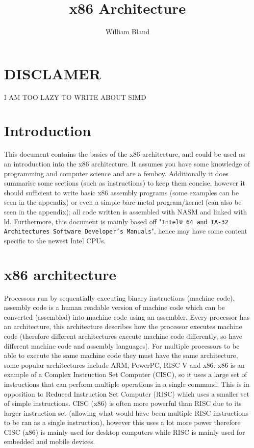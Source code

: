 \documentclass{article}
\title{\textbf{x86 Architecture}}
\author{William Bland}
\newcommand{\layout}[1]{\parbox{\linewidth}{#1}}
\begin{document}
\maketitle
\tableofcontents
\newpage

\nocite{*}

\layout{
  \section{DISCLAMER}

  { \fontsize{30pt}{35pt}\selectfont I AM TOO LAZY TO WRITE ABOUT SIMD }

  \section{Introduction}

  This document contains the basics of the x86 architecture, and could be used as an introduction into the x86 architecture.
  It assumes you have some knowledge of programming and computer science and are a femboy.
  Additionally it does summarise some sections (such as instructions) to keep them concise, however it should sufficient to write basic x86 assembly programs (some examples can be seen in the appendix) or even a simple bare-metal program/kernel (can also be seen in the appendix);
  all code written is assembled with NASM and linked with ld.
  Furthermore, this document is mainly based off "\texttt{Intel® 64 and IA-32 Architectures Software Developer’s Manuals}", hence may have some content specific to the newest Intel CPUs.
}

\layout{
  \section{x86 architecture}

  Processors run by sequentially executing binary instructions (machine code),
  assembly code is a human readable version of machine code which can be converted (assembled) into machine code using an assembler.
  Every processor has an architecture, this architecture describes how the processor executes machine code (therefore different architectures execute machine code differently, so have different machine code and assembly languages).
  For multiple processors to be able to execute the same machine code they must have the same architecture, some popular architectures include ARM, PowerPC, RISC-V and x86.
  x86 is an example of a Complex Instruction Set Computer (CISC), so it uses a large set of instructions that can perform multiple operations in a single command.
  This is in opposition to Reduced Instruction Set Computer (RISC) which uses a smaller set of simple instructions.
  CISC (x86) is often more powerful than RISC due to its larger instruction set (allowing what would have been multiple RISC instructions to be ran as a single instruction), however this uses a lot more power therefore CISC (x86) is mainly used for desktop computers while RISC is mainly used for embedded and mobile devices.
}
\end{document}
